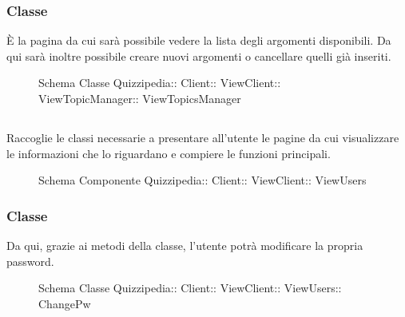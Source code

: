 \subsubsection{Classe }
È la pagina da cui sarà possibile vedere la lista degli argomenti disponibili. Da qui sarà inoltre possibile creare nuovi argomenti o cancellare quelli già inseriti.
\begin{figure}[H]
\centering
\noindent{}
\caption[Schema Classe ViewTopicsManager]{Schema Classe Quizzipedia:: Client:: ViewClient:: ViewTopicManager:: ViewTopicsManager}
\end{figure}
\subsection{}
Raccoglie le classi necessarie a presentare all'utente le pagine da cui visualizzare le informazioni che lo riguardano e compiere le funzioni principali.
\begin{figure}[H]
\centering
\noindent{}
\caption[Schema Componente Quizzipedia::Client::ViewClient::ViewUsers]{Schema Componente Quizzipedia:: Client:: ViewClient:: ViewUsers}
\end{figure}
\subsubsection{Classe }
Da qui, grazie ai metodi della classe, l'utente potrà modificare la propria password.
\begin{figure}[H]
\centering
\noindent{}
\caption[Schema Classe ChangePw]{Schema Classe Quizzipedia:: Client:: ViewClient:: ViewUsers:: ChangePw}
\end{figure}
